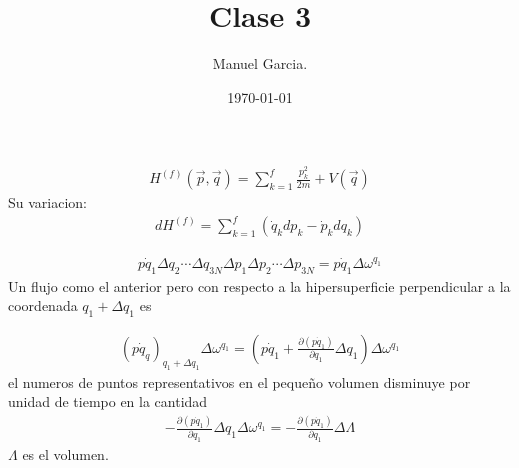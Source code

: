 \documentclass{article}
\title{Clase 3 }
\author{Manuel Garcia.}
\date{\today}
\begin{document}
\maketitle

\section{}
\begin{gather*}
  H ^ {(f) } (\vec p, \vec q ) = \displaystyle\sum_{k = 1 }^{f }\frac{p_k^2 }{2m }+ V(\vec q ) 
\end{gather*}
Su variacion: 
\begin{gather*}
  dH ^ {(f) } = \displaystyle\sum_{k = 1 }^{ f } \left(\dot q_k dp_k - \dot p_k dq_k \right) 
\end{gather*}


\hfill 

\hfill 

\hfill 

\begin{gather*}
  p \dot q_1 \Delta q_2 \cdots \Delta q _{3N } \Delta p_1 \Delta p_2 \cdots \Delta p _{3N } = p \dot q_1 \Delta \omega ^ {q_1 }
\end{gather*}
Un flujo como el anterior pero con respecto a la hipersuperficie perpendicular a la coordenada $ q_1 + \Delta q_1  $ es

\begin{gather*}
  (p \dot q _q) _{q_1 + \Delta q_1 } \Delta \omega ^ {q_1 } = \left(p \dot q_1 + \frac{\partial (p \dot q_1 ) }{\partial q_1 } \Delta q_1 \right)\Delta\omega ^ {q_1 }
\end{gather*}
el numeros de puntos representativos en el pequeño volumen disminuye por unidad de tiempo en la cantidad 
\begin{gather*}
  - \frac{\partial (p \dot q_1 ) }{\partial q_1 }\Delta q_1 \Delta \omega ^ {q_1 } = - \frac{\partial (p\dot q_1 ) }{\partial q_1 } \Delta \Lambda 
\end{gather*}
$ \Lambda $ es el volumen. 
\end{document}
